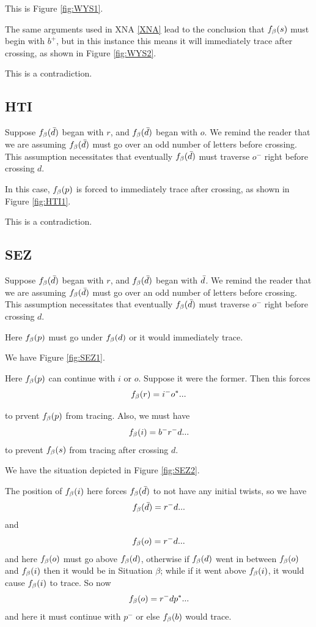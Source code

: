 This is Figure \ref{fig:WYS1}.

The same arguments used in XNA \ref{XNA} lead to the conclusion that $f_\beta(s)$ must begin with $b^+$, but in this instance this means it will immediately trace after crossing, as shown in Figure \ref{fig:WYS2}.

This is a contradiction.

\subsection{HTI}\label{HTI}
Suppose $f_\beta(\bar{d})$ began with $r$, and $f_\beta(\bar{d})$ began with $o$. We remind the reader that we are assuming $f_\beta(\bar{d})$ must go over an odd number of letters before crossing. This assumption necessitates that eventually $f_\beta(\bar{d})$ must traverse $o^-$ right before crossing $d$.

In this case, $f_\beta(p)$ is forced to immediately trace after crossing, as shown in Figure \ref{fig:HTI1}.

This is a contradiction.

\subsection{SEZ}\label{SEZ}
Suppose $f_\beta(\bar{d})$ began with $r$, and $f_\beta(\bar{d})$ began with $\bar{d}$. We remind the reader that we are assuming $f_\beta(\bar{d})$ must go over an odd number of letters before crossing. This assumption necessitates that eventually $f_\beta(\bar{d})$ must traverse $o^-$ right before crossing $d$.

Here $f_\beta(p)$ must go under $f_\beta(d)$ or it would immediately trace.

We have Figure \ref{fig:SEZ1}.

Here $f_\beta(p)$ can continue with $i$ or $o$. Suppose it were the former. Then this forces 
\[
f_\beta(r) = i^- o^*...
\]

to prvent $f_\beta(p)$ from tracing. Also, we must have
\[
f_\beta(i) = b^- r^- d...
\]
to prevent $f_\beta(s)$ from tracing after crossing $d$.

We have the situation depicted in Figure \ref{fig:SEZ2}.

The position of $f_\beta(i)$ here forces $f_\beta(\bar{d})$ to not have any initial twists, so we have
\[
f_\beta(\bar{d}) = r^- d...
\]
and
\[
f_\beta(o) = r^- d...
\]
and here $f_\beta(o)$ must go above $f_\beta(d)$, otherwise if $f_\beta(d)$ went in between $f_\beta(o)$ and $f_\beta(i)$ then it would be in Situation $\beta$; while if it went above $f_\beta(i)$, it would cause $f_\beta(i)$ to trace. So now
\[
f_\beta(o) = r^- d p^*...
\]
and here it must continue with $p^-$ or else $f_\beta(b)$ would trace.

